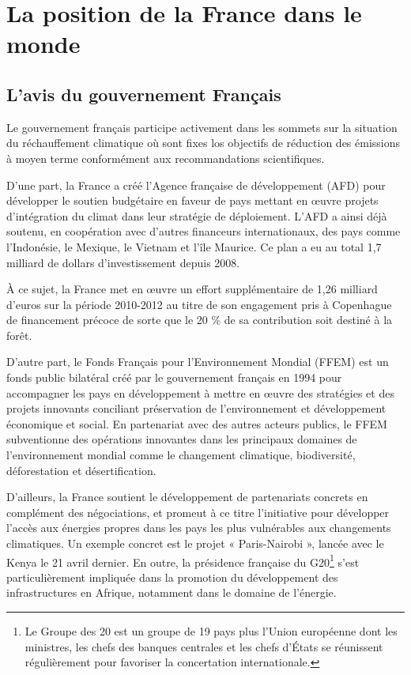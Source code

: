 \documentclass[a4paper,11pt]{article}
\begin{document}

\section{La position de la France dans le monde}

\subsection{L’avis du gouvernement  Français}

Le gouvernement français participe activement dans les sommets sur la situation du réchauffement climatique où sont fixes los objectifs de réduction des émissions à moyen terme conformément aux recommandations scientifiques. 

D'une part, la France a créé l’Agence française de développement (AFD) pour développer le soutien budgétaire en faveur de pays mettant en œuvre projets d’intégration du climat dans leur stratégie de déploiement. L’AFD a ainsi déjà soutenu, en coopération avec d’autres financeurs internationaux, des pays comme l’Indonésie, le Mexique, le Vietnam et l’île Maurice. Ce plan a eu au total 1,7 milliard de dollars d’investissement depuis 2008.

À ce sujet, la France met en œuvre un effort supplémentaire de 1,26 milliard d’euros sur la période 2010-2012 au titre de son engagement pris à Copenhague de financement précoce de sorte que le 20 \% de sa contribution soit destiné à la forêt.

D’autre part, le Fonds Français pour l'Environnement Mondial (FFEM) est un fonds public bilatéral créé par le gouvernement français en 1994 pour accompagner les pays en développement à mettre en œuvre des stratégies et des projets innovants conciliant préservation de l’environnement et développement économique et social. En partenariat avec des autres acteurs publics, le FFEM subventionne des opérations innovantes dans les principaux domaines de l’environnement mondial comme le changement climatique, biodiversité, déforestation et désertification.

D’ailleurs, la France soutient le développement de partenariats concrets en complément des négociations, et promeut à ce titre l’initiative pour développer l'accès aux énergies propres dans les pays les plus vulnérables aux changements climatiques. Un exemple concret est le projet « Paris-Nairobi », lancée avec le Kenya le 21 avril dernier. En outre, la présidence française du G20\footnote{Le Groupe des 20 est un groupe de 19 pays plus l'Union européenne dont les ministres, les chefs des banques centrales et les chefs d'États se réunissent régulièrement pour favoriser la concertation internationale.} s’est particulièrement impliquée dans la promotion du développement des infrastructures en Afrique, notamment dans le domaine de l’énergie. 
\end{document}
